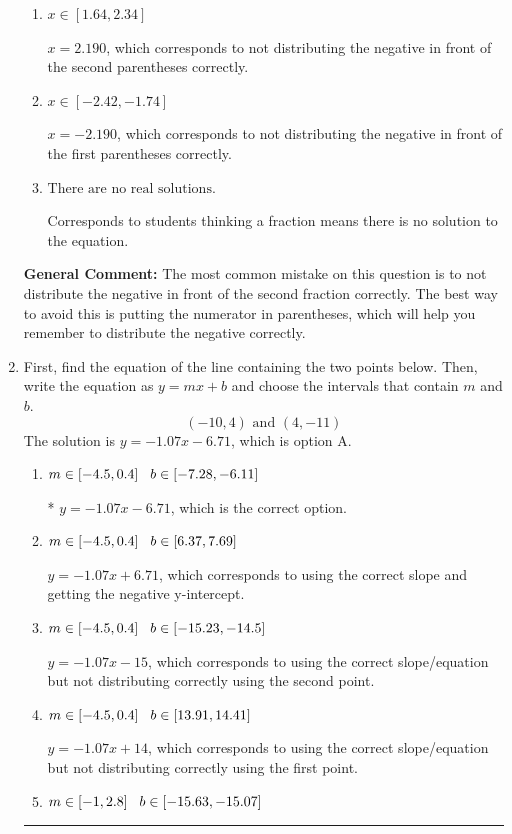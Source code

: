 \documentclass{extbook}[14pt]
\newcommand{\litem}[1]{\item #1

\rule{\textwidth}{0.4pt}}
\begin{document}
\begin{enumerate}
{\begin{enumerate}[label=\Alph*.]
$x = 1.179$, which corresponds to getting the negative of the actual solution.
\item \( x \in [1.64, 2.34] \)

$x = 2.190$, which corresponds to not distributing the negative in front of the second parentheses correctly.
\item \( x \in [-2.42, -1.74] \)

$x = -2.190$, which corresponds to not distributing the negative in front of the first parentheses correctly.
\item \( \text{There are no real solutions.} \)

Corresponds to students thinking a fraction means there is no solution to the equation.
\end{enumerate}

\textbf{General Comment:} The most common mistake on this question is to not distribute the negative in front of the second fraction correctly. The best way to avoid this is putting the numerator in parentheses, which will help you remember to distribute the negative correctly.
}
\litem{
First, find the equation of the line containing the two points below. Then, write the equation as $ y=mx+b $ and choose the intervals that contain $m$ and $b$.
\[ (-10, 4) \text{ and } (4, -11) \]The solution is \( y = -1.07x -6.71 \), which is option A.\begin{enumerate}[label=\Alph*.]
\item \( m \in [-4.5, 0.4] \hspace*{3mm} b \in [-7.28, -6.11] \)

* $y = -1.07x -6.71$, which is the correct option.
\item \( m \in [-4.5, 0.4] \hspace*{3mm} b \in [6.37, 7.69] \)

 $y = -1.07x + 6.71$, which corresponds to using the correct slope and getting the negative y-intercept.
\item \( m \in [-4.5, 0.4] \hspace*{3mm} b \in [-15.23, -14.5] \)

 $y = -1.07x -15$, which corresponds to using the correct slope/equation but not distributing correctly using the second point.
\item \( m \in [-4.5, 0.4] \hspace*{3mm} b \in [13.91, 14.41] \)

 $y = -1.07x + 14$, which corresponds to using the correct slope/equation but not distributing correctly using the first point.
\item \( m \in [-1, 2.8] \hspace*{3mm} b \in [-15.63, -15.07] \)


\end{enumerate}}
\end{enumerate}
\end{document}
